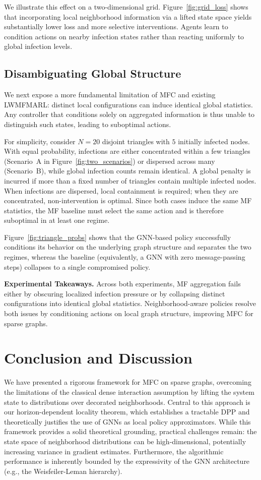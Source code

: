 \documentclass{article}
\begin{document}
We illustrate this effect on a two-dimensional grid. Figure~\ref{fig:grid_loss} shows that incorporating local neighborhood information via a lifted state space yields substantially lower loss and more selective interventions. Agents learn to condition actions on nearby infection states rather than reacting uniformly to global infection levels.

\subsection{Disambiguating Global Structure}
We next expose a more fundamental limitation of MFC and existing LWMFMARL: distinct local configurations can induce identical global statistics. Any controller that conditions solely on aggregated information is thus unable to distinguish such states, leading to suboptimal actions.

For simplicity, consider $N=20$ disjoint triangles with $5$ initially infected nodes. With equal probability, infections are either concentrated within a few triangles (Scenario~A in Figure~\ref{fig:two_scenarios}) or dispersed across many (Scenario~B), while global infection counts remain identical. A global penalty is incurred if more than a fixed number of triangles contain multiple infected nodes. When infections are dispersed, local containment is required; when they are concentrated, non-intervention is optimal. Since both cases induce the same MF statistics, the MF baseline must select the same action and is therefore suboptimal in at least one regime.

Figure~\ref{fig:triangle_probs} shows that the GNN-based policy successfully conditions its behavior on the underlying graph structure and separates the two regimes, whereas the baseline (equivalently, a GNN with zero message-passing steps) collapses to a single compromised policy.

\noindent\textbf{Experimental Takeaways.}
Across both experiments, MF aggregation fails either by obscuring localized infection pressure or by collapsing distinct configurations into identical global statistics. Neighborhood-aware policies resolve both issues by conditioning actions on local graph structure, improving MFC for sparse graphs.


\section{Conclusion and Discussion}

We have presented a rigorous framework for MFC on sparse graphs, overcoming the limitations of the classical dense interaction assumption by lifting the system state to distributions over decorated neighborhoods. Central to this approach is our horizon-dependent locality theorem, which establishes a tractable DPP and theoretically justifies the use of GNNs as local policy approximators. While this framework provides a solid theoretical grounding, practical challenges remain: the state space of neighborhood distributions can be high-dimensional, potentially increasing variance in gradient estimates. Furthermore, the algorithmic performance is inherently bounded by the expressivity of the GNN architecture (e.g., the Weisfeiler-Leman hierarchy).
\end{document}
